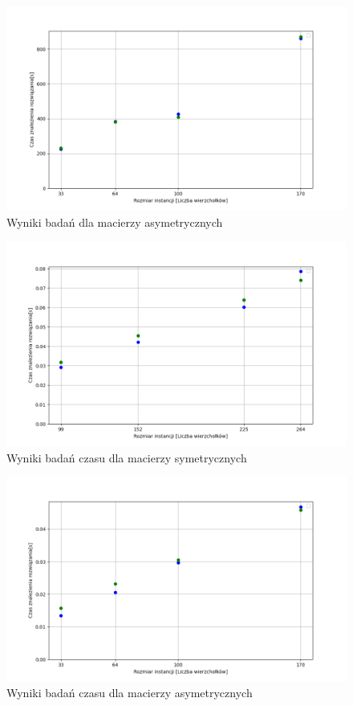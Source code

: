 \documentclass{article}
\begin{document}
        \begin{figure}[ht]
          \centering
          \includegraphics[width=\textwidth]{src/plots/asymAnNeigMet.png}
          \caption{Wyniki badań dla macierzy asymetrycznych}
          \label{fig:asymAnNeig}
        \end{figure}
        \FloatBarrier
        
        \FloatBarrier
        \begin{figure}[ht]
          \centering
          \includegraphics[width=\textwidth]{src/plots/symAnNeigMetTime.png}
          \caption{Wyniki badań czasu  dla macierzy symetrycznych}
          \label{fig:symAnNeigT}
        \end{figure}
        \begin{figure}[ht]
          \centering
          \includegraphics[width=\textwidth]{src/plots/asymAnNeigMetTime.png}
          \caption{Wyniki badań czasu  dla macierzy asymetrycznych}
          \label{fig:asymAnNeigT}
        \end{figure}
\end{document}
